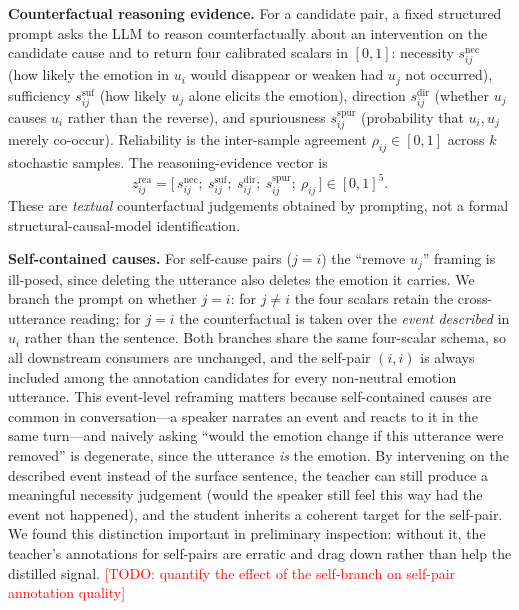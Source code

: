 \documentclass[journal]{IEEEtran}
\newcommand{\todo}[1]{\textcolor{red}{[TODO: #1]}}
\begin{document}
\noindent\textbf{Counterfactual reasoning evidence.} For a candidate pair, a fixed
structured prompt asks the LLM to reason counterfactually about an intervention on the
candidate cause and to return four calibrated scalars in $[0,1]$: necessity
$s_{ij}^{\mathrm{nec}}$ (how likely the emotion in $u_i$ would disappear or weaken had $u_j$
not occurred), sufficiency $s_{ij}^{\mathrm{suf}}$ (how likely $u_j$ alone elicits the
emotion), direction $s_{ij}^{\mathrm{dir}}$ (whether $u_j$ causes $u_i$ rather than the
reverse), and spuriousness $s_{ij}^{\mathrm{spur}}$ (probability that $u_i,u_j$ merely
co-occur). Reliability is the inter-sample agreement $\rho_{ij}\in[0,1]$ across $k$
stochastic samples. The reasoning-evidence vector is
\begin{equation}
z_{ij}^{\mathrm{rea}}=\big[\,s_{ij}^{\mathrm{nec}};\ s_{ij}^{\mathrm{suf}};\ s_{ij}^{\mathrm{dir}};\ s_{ij}^{\mathrm{spur}};\ \rho_{ij}\,\big]\in[0,1]^{5}.
\end{equation}
These are \emph{textual} counterfactual judgements obtained by prompting, not a formal
structural-causal-model identification.

\noindent\textbf{Self-contained causes.} For self-cause pairs ($j=i$) the ``remove $u_j$''
framing is ill-posed, since deleting the utterance also deletes the emotion it carries. We
branch the prompt on whether $j=i$: for $j\neq i$ the four scalars retain the cross-utterance
reading; for $j=i$ the counterfactual is taken over the \emph{event described} in $u_i$
rather than the sentence. Both branches share the same four-scalar schema, so all downstream
consumers are unchanged, and the self-pair $(i,i)$ is always included among the annotation
candidates for every non-neutral emotion utterance. This event-level reframing matters because
self-contained causes are common in conversation---a speaker narrates an event and reacts to it
in the same turn---and naively asking ``would the emotion change if this utterance were
removed'' is degenerate, since the utterance \emph{is} the emotion. By intervening on the
described event instead of the surface sentence, the teacher can still produce a meaningful
necessity judgement (would the speaker still feel this way had the event not happened), and the
student inherits a coherent target for the self-pair. We found this distinction important in
preliminary inspection: without it, the teacher's annotations for self-pairs are erratic and
drag down rather than help the distilled signal. \todo{quantify the effect of the self-branch
on self-pair annotation quality}
\end{document}
